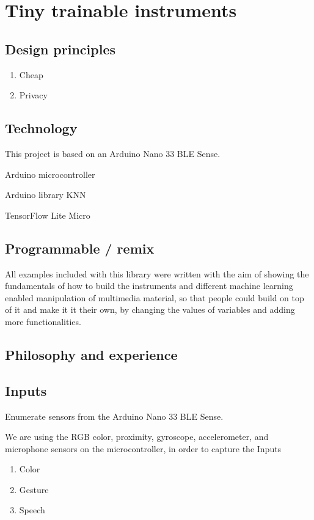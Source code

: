 \chapter{Tiny trainable instruments}

\section{Design principles}

\begin{enumerate}
  \item Cheap
  \item Privacy
\end{enumerate}

\section{Technology}

This project is based on an Arduino Nano 33 BLE Sense.

Arduino microcontroller

Arduino library KNN

TensorFlow Lite Micro

\section{Programmable / remix}

All examples included with this library were written with the aim of showing the fundamentals of how to build the instruments and different machine learning enabled manipulation of multimedia material, so that people could build on top of it and make it it their own, by changing the values of variables and adding more functionalities.

\section{Philosophy and experience}

\section{Inputs}

Enumerate sensors from the Arduino Nano 33 BLE Sense.

We are using the RGB color, proximity, gyroscope, accelerometer, and microphone sensors on the microcontroller, in order to capture the Inputs

\begin{enumerate}
  \item Color
  \item Gesture
  \item Speech
\end{enumerate}

